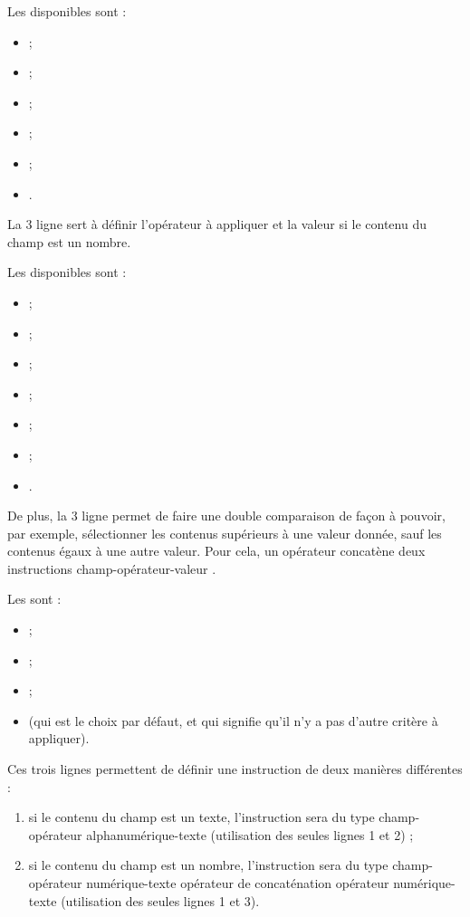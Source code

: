 Les  disponibles sont :

\begin{itemize}
	\item {} ;
	\item {} ;
	\item {} ;
	\item {} ;
	\item {} ;
	\item {}.
\end{itemize}

La 3 ligne sert à définir l'opérateur à appliquer et la valeur si le contenu du champ est un nombre. 

Les  disponibles sont :

\begin{itemize}
	\item {} ;
	\item{} ;
	\item {} ;
	\item {} ;
	\item{} ;
	\item{} ;
	\item {}.
\end{itemize}

De plus, la 3 ligne permet de faire une double comparaison de façon à pouvoir, par exemple, sélectionner les contenus supérieurs à une valeur donnée, sauf les contenus égaux à une autre valeur. Pour cela, un opérateur concatène deux instructions \og champ-opérateur-valeur \fg{}. 

Les  sont :

\begin{itemize}
	\item {} ;
	\item {} ;
	\item {} ;
	\item {} (qui est le choix par défaut, et qui signifie qu'il n'y a pas d'autre
	critère à appliquer).
\end{itemize}

Ces trois lignes permettent de définir une instruction de deux manières différentes :
\begin{enumerate}
	 \item si le contenu du champ est un texte, l'instruction sera du type \og champ-opérateur alphanumérique-texte \fg{} (utilisation des seules lignes 1 et 2) ;
	 \item si le contenu du champ est un nombre, l'instruction sera du type \og champ-opérateur numérique-texte \fg{} \og opérateur de concaténation \fg{} \og opérateur numérique-texte \fg{} (utilisation des seules lignes 1 et 3).
\end{enumerate}

